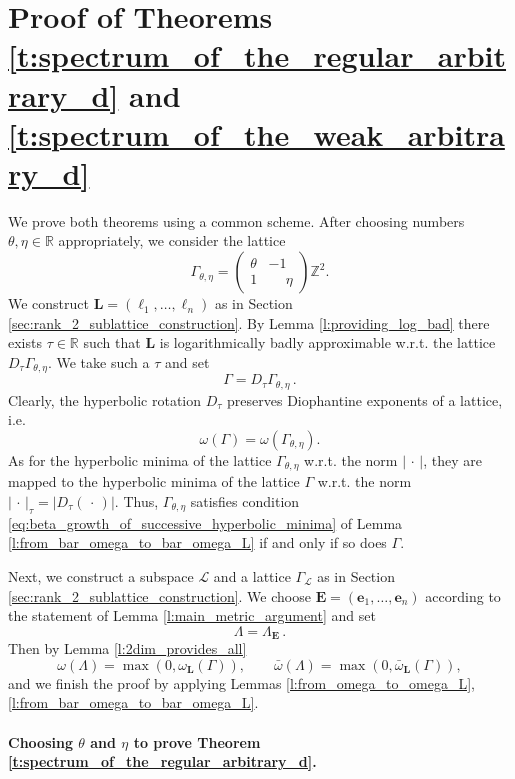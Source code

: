 \documentclass[a4paper,12pt]{article}
\theoremstyle{definition}
\theoremstyle{remark}
\theoremstyle{plain}
\renewcommand{\vec}[1]{\mathbf{#1}}
\newcommand{\R}{\mathbb{R}}
\newcommand{\Z}{\mathbb{Z}}
\newcommand{\La}{\Lambda}
\newcommand{\Ga}{\Gamma}
\newcommand{\cL}{\mathcal{L}}
\newcommand{\bE}{\mathbf{E}}
\newcommand{\bL}{\mathbf{L}}
\begin{document}
\section{Proof of Theorems \ref{t:spectrum_of_the_regular_arbitrary_d} and \ref{t:spectrum_of_the_weak_arbitrary_d}}\label{sec:proofs}


We prove both theorems using a common scheme. After choosing numbers $\theta,\eta\in\R$ appropriately, we consider the lattice
\[
  \Ga_{\theta,\eta}=
  \begin{pmatrix}
    \theta & -1 \\
    1 & \phantom{-}\eta
  \end{pmatrix}
  \Z^2.
\]
We construct $\bL=(\ell_1,\ldots,\ell_n)$ as in Section \ref{sec:rank_2_sublattice_construction}. By Lemma \ref{l:providing_log_bad} there exists $\tau\in\R$ such that $\bL$ is logarithmically badly approximable w.r.t. the lattice $D_\tau\Ga_{\theta,\eta}$. We take such a $\tau$ and set
\[
  \Ga=D_\tau\Ga_{\theta,\eta}\,.
\]
Clearly, the hyperbolic rotation $D_\tau$ preserves Diophantine exponents of a lattice, i.e.
\begin{equation}\label{eq:hyperbolic_rotation_preserves_omegas}
  \omega(\Ga)=
  \omega(\Ga_{\theta,\eta}).
\end{equation}
As for the hyperbolic minima of the lattice $\Ga_{\theta,\eta}$ w.r.t. the norm $|\,\cdot\,|$, they are mapped to the hyperbolic minima of the lattice $\Ga$ w.r.t. the norm $|\,\cdot\,|_\tau=|D_\tau(\,\cdot\,)|$. Thus, $\Ga_{\theta,\eta}$ satisfies condition \eqref{eq:beta_growth_of_successive_hyperbolic_minima} of Lemma \ref{l:from_bar_omega_to_bar_omega_L} if and only if so does $\Ga$.

Next, we construct a subspace $\cL$ and a lattice $\Ga_\cL$ as in Section \ref{sec:rank_2_sublattice_construction}. We choose $\bE=(\vec e_1,\ldots,\vec e_n)$ according to the statement of Lemma \ref{l:main_metric_argument} and set
\[
  \La=\La_\bE\,.
\]
Then by Lemma \ref{l:2dim_provides_all}
\begin{equation}\label{eq:2dim_provides_all}
  \omega(\La)=\max(0,\omega_\bL(\Ga)),\qquad
  \bar\omega(\La)=\max(0,\bar\omega_\bL(\Ga)),
\end{equation}
and we finish the proof by applying Lemmas \ref{l:from_omega_to_omega_L}, \ref{l:from_bar_omega_to_bar_omega_L}.


\paragraph{Choosing $\theta$ and $\eta$ to prove Theorem \ref{t:spectrum_of_the_regular_arbitrary_d}.}
\end{document}
